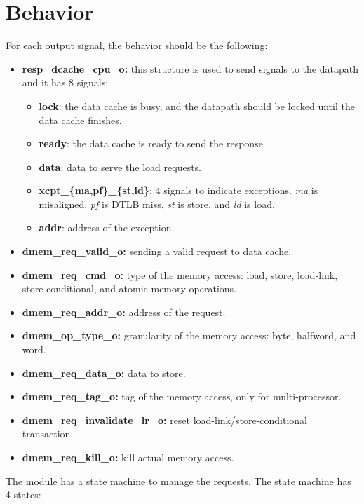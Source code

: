 \section{Behavior}
\label{behavior}

For each output signal, the behavior should be the following:

\begin{itemize}
    \item \textbf{resp\_dcache\_cpu\_o:} this structure is used to send signals to the datapath and it has 8 signals:
    \begin{itemize}
        \item \textbf{lock}: the data cache is busy, and the datapath should be locked until the data cache finishes.
        \item \textbf{ready}: the data cache is ready to send the response.
        \item \textbf{data}: data to serve the load requests.
        \item \textbf{xcpt\_\{ma,pf\}\_\{st,ld\}}: 4 signals to indicate exceptions. \textit{ma} is misaligned, \textit{pf} is DTLB miss, \textit{st} is store, and \textit{ld} is load.
        \item \textbf{addr}: address of the exception.
    \end{itemize}
    \item \textbf{dmem\_req\_valid\_o:} sending a valid request to data cache.
    \item \textbf{dmem\_req\_cmd\_o:} type of the memory access: load, store, load-link, store-conditional, and atomic memory operations.
    \item \textbf{dmem\_req\_addr\_o:} address of the request.
    \item \textbf{dmem\_op\_type\_o:} granularity of the memory access: byte, halfword, and word.
    \item \textbf{dmem\_req\_data\_o:} data to store.
    \item \textbf{dmem\_req\_tag\_o:} tag of the memory access, only for multi-processor.
    \item \textbf{dmem\_req\_invalidate\_lr\_o:} reset load-link/store-conditional transaction.
    \item \textbf{dmem\_req\_kill\_o:} kill actual memory access.
\end{itemize}

The module has a state machine to manage the requests.
The state machine has 4 states:


